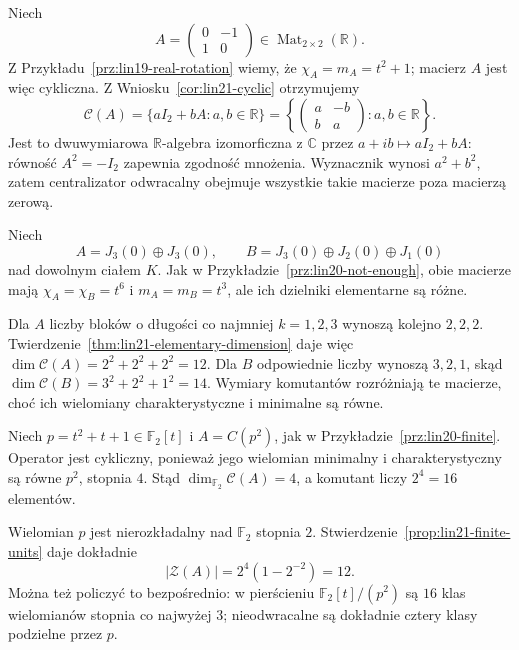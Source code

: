 \begin{przyklad}
\label{prz:lin21-rotation}
Niech
\[
 A=\begin{pmatrix}0&-1\\1&0\end{pmatrix}
 \in\operatorname{Mat}_{2\times2}(\mathbb R).
\]
Z Przykładu~\ref{prz:lin19-real-rotation}
wiemy, że \(\chi_A=m_A=t^2+1\);
macierz \(A\) jest więc cykliczna.
Z Wniosku~\ref{cor:lin21-cyclic}
otrzymujemy
\[
 \mathcal C(A)=
 \{aI_2+bA:a,b\in\mathbb R\}
 =\left\{\begin{pmatrix}a&-b\\b&a\end{pmatrix}
             :a,b\in\mathbb R\right\}.
\]
Jest to dwuwymiarowa
\(\mathbb R\)-algebra izomorficzna
z \(\mathbb C\) przez
\(a+ib\mapsto aI_2+bA\):
równość \(A^2=-I_2\)
zapewnia zgodność mnożenia.
Wyznacznik wynosi \(a^2+b^2\),
zatem centralizator odwracalny
obejmuje wszystkie takie macierze
poza macierzą zerową.
\end{przyklad}

\begin{przyklad}
\label{prz:lin21-same-polys}
Niech
\[
 A=J_3(0)\oplus J_3(0),\qquad
 B=J_3(0)\oplus J_2(0)\oplus J_1(0)
\]
nad dowolnym ciałem \(K\).
Jak w Przykładzie~\ref{prz:lin20-not-enough},
obie macierze mają
\(\chi_A=\chi_B=t^6\)
i \(m_A=m_B=t^3\), ale
ich dzielniki elementarne są różne.

Dla \(A\) liczby bloków
o długości co najmniej \(k=1,2,3\)
wynoszą kolejno \(2,2,2\).
Twierdzenie~\ref{thm:lin21-elementary-dimension}
daje więc
\(\dim\mathcal C(A)=2^2+2^2+2^2=12\).
Dla \(B\) odpowiednie liczby
wynoszą \(3,2,1\), skąd
\(\dim\mathcal C(B)=3^2+2^2+1^2=14\).
Wymiary komutantów rozróżniają
te macierze, choć ich wielomiany
charakterystyczne i minimalne są równe.
\end{przyklad}

\begin{przyklad}
\label{prz:lin21-finite}
Niech \(p=t^2+t+1\in\mathbb F_2[t]\)
i \(A=C(p^2)\), jak w
Przykładzie~\ref{prz:lin20-finite}.
Operator jest cykliczny,
ponieważ jego wielomian
minimalny i charakterystyczny
są równe \(p^2\), stopnia \(4\).
Stąd \(\dim_{\mathbb F_2}\mathcal C(A)=4\),
a komutant liczy \(2^4=16\) elementów.

Wielomian \(p\) jest nierozkładalny
nad \(\mathbb F_2\) stopnia \(2\).
Stwierdzenie~\ref{prop:lin21-finite-units}
daje dokładnie
\[
 |\mathcal Z(A)|
 =2^4(1-2^{-2})=12.
\]
Można też policzyć to bezpośrednio:
w pierścieniu \(\mathbb F_2[t]/(p^2)\)
są \(16\) klas wielomianów
stopnia co najwyżej \(3\);
nieodwracalne są dokładnie
cztery klasy podzielne przez \(p\).
\end{przyklad}

